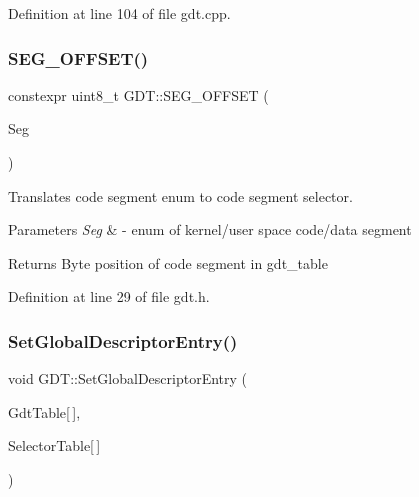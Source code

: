 Definition at line 104 of file gdt.\+cpp.

\mbox{\label{namespace_g_d_t_a3f6672477fedb061897f9c710f539ccb}} 
\subsubsection{\texorpdfstring{S\+E\+G\+\_\+\+O\+F\+F\+S\+E\+T()}{SEG\_OFFSET()}}
{\footnotesize\ttfamily constexpr uint8\+\_\+t G\+D\+T\+::\+S\+E\+G\+\_\+\+O\+F\+F\+S\+ET (\begin{DoxyParamCaption}\item[{const \hyperlink{namespace_g_d_t_af2b09941ee46a489ebaccfed5c839154}{Segment}}]{Seg }\end{DoxyParamCaption})\hspace{0.3cm}{\ttfamily [inline]}}



Translates code segment enum to code segment selector. 


\begin{DoxyParams}{Parameters}
{\em Seg} & -\/ enum of kernel/user space code/data segment \\
\hline
\end{DoxyParams}
\begin{DoxyReturn}{Returns}
Byte position of code segment in gdt\+\_\+table 
\end{DoxyReturn}


Definition at line 29 of file gdt.\+h.

\mbox{\label{namespace_g_d_t_a5d0041eb890e6c1f40d8a919494c2354}} 
\subsubsection{\texorpdfstring{Set\+Global\+Descriptor\+Entry()}{SetGlobalDescriptorEntry()}}
{\footnotesize\ttfamily void G\+D\+T\+::\+Set\+Global\+Descriptor\+Entry (\begin{DoxyParamCaption}\item[{\hyperlink{union_g_d_t_1_1_gdt_entry}{Gdt\+Entry}}]{Gdt\+Table\mbox{[}$\,$\mbox{]},  }\item[{const \hyperlink{struct_g_d_t_1_1_selector}{Selector}}]{Selector\+Table\mbox{[}$\,$\mbox{]} }\end{DoxyParamCaption})}



